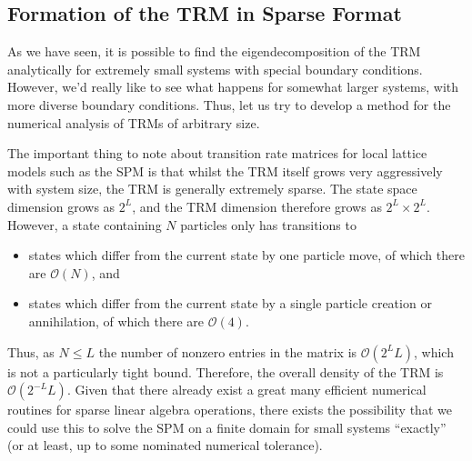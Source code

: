 \subsection{Formation of the TRM in Sparse Format}

As we have seen, it is possible to find the eigendecomposition of the TRM analytically for extremely
small systems with special boundary conditions. However, we'd really like to see what happens for
somewhat larger systems, with more diverse boundary conditions. Thus, let us try to develop
a method for the numerical analysis of TRMs of arbitrary size.

The important thing to note about transition rate matrices for local lattice models
such as the SPM is that whilst the TRM itself grows very aggressively with system size, the TRM is generally extremely sparse.
The state space dimension grows as $2^L$, and the TRM dimension therefore grows as
$2^L \times 2^L$. However, a state containing $N$ particles only has transitions to
\begin{itemize}
 \item states which differ from the current state by one particle move, of which there
 are $\mathcal{O}(N)$, and
 \item states which differ from the current state by a single particle creation or
 annihilation, of which there are $\mathcal{O}(4)$.
\end{itemize}
Thus, as $N \le L$ the number of nonzero entries in the matrix is 
$\mathcal{O}(2^{L}L)$,
which is not a particularly tight bound. Therefore, the overall density of the TRM
is $\mathcal{O}(2^{-L}L)$. Given that there already exist a great many efficient
numerical routines for sparse linear algebra operations, there exists the possibility
that we could use this to solve the SPM on a finite domain for small systems
``exactly'' (or at least, up to some nominated numerical tolerance).

